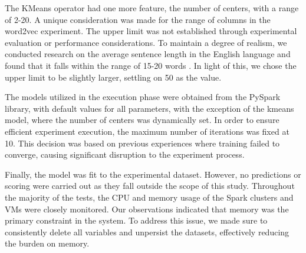 \documentclass[conference]{IEEEtran}
\begin{document}
The KMeans operator had one more feature, the number of centers, with a range of 2-20.
A unique consideration was made for the range of columns in the word2vec experiment. The upper limit was not established through experimental evaluation or performance considerations. To maintain a degree of realism, we conducted research on the average sentence length in the English language and found that it falls within the range of 15-20 words \cite{acropolitan}. In light of this, we chose the upper limit to be slightly larger, settling on 50 as the value.
\par
The models utilized in the execution phase were obtained from the PySpark library, with default values for all parameters, with the exception of the kmeans model, where the number of centers was dynamically set. In order to ensure efficient experiment execution, the maximum number of iterations was fixed at 10. This decision was based on previous experiences where training failed to converge, causing significant disruption to the experiment process.
\par
Finally, the model was fit to the experimental dataset. However, no predictions or scoring were carried out as they fall outside the scope of this study.
Throughout the majority of the tests, the CPU and memory usage of the Spark clusters and VMs were closely monitored. Our observations indicated that memory was the primary constraint in the system. To address this issue, we made sure to consistently delete all variables and unpersist the datasets, effectively reducing the burden on memory.
\end{document}
